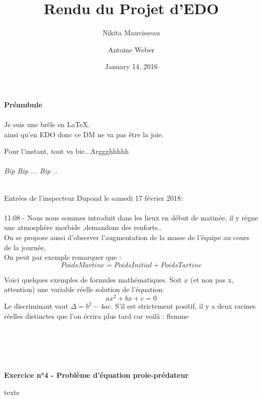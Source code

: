 \documentclass[10pt]{article}
\begin{document}
\title{Rendu du Projet d'EDO	}
\date{January 14, 2016}
\author{Nikita Mauvisseau \and Antoine Weber}
\maketitle
\textbf{Préambule}
~~\\
~~\\

Je suis une brêle en \LaTeX.\\ ainsi qu'en EDO donc ce DM ne va pas être la joie.

Pour l'instant, tout va bie...Arggghhhhh
~~\\

~~\\
\textit{Bip Bip ... Bip ..}
 
~~\\
Entrées de l'inspecteur Dupond le samedi 17 février 2018:\\
 
 ~~\\
11:08  - Nous nous sommes introduit dans les lieux en début de matinée,
 il y règne une atmosphère morbide ,demandons des renforts..
 ~~\\

On se propose aussi d'observer l'augmentation de la masse de l'équipe au cours de la journée,\\
On peut par exemple remarquer que :\\

$$ PoidsMartine = PoidsInitial + PoidsTartine$$


Voici quelques exemples de formules mathématiques. Soit $x$ (et non pas x,
attention) une variable réelle solution de l’équation:
\begin{equation}
ax^2+bx+c=0
\end{equation}
Le discriminant vaut $\Delta=b^2-4ac$. S’il est strictement
positif, il y a deux racines réelles distinctes que l'on écrira plus tard car voilà : flemme
~~\\
~~\\
~~\\
~~\\
~~\\
~~\\


\textbf{Exercice n°4 - Problème d'équation proie-prédateur}
	
texte
	
\end{document}
